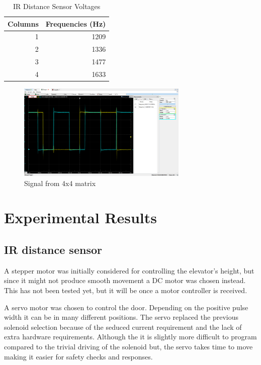 \documentclass{article}
\begin{document}
	            \begin{table}[!ht]
  	        \begin{center}
                \caption{IR Distance Sensor Voltages}
    		    \label{tab:table4}
    		    \begin{tabular}{r|r}
      			    \textbf{Columns} & \textbf{Frequencies (Hz)} \\
			        \hline
      			    1 & 1209\\
      			    2 & 1336\\
      			    3 & 1477\\
      			    4 & 1633\\
   			    \end{tabular}
  	        \end{center}
	    \end{table}
	    
	    \begin{figure}[!ht]
	        \begin{center}
		    \includegraphics[width=230pt]{buttontest.PNG}
		    \caption{Signal from 4x4 matrix}
	    	\label{fig:buttontest}
	    	\end{center}
	    \end{figure}
	    
    \section{Experimental Results}
        \subsection{IR distance sensor}
        A stepper motor was initially considered for controlling the elevator's height, but since it might not produce smooth movement a DC motor was chosen instead. This has not been tested yet, but it will be once a motor controller is received.
    
        A servo motor\cite{project_overview:servo_datasheet} was chosen to control the door. Depending on the positive pulse width it can be in many different positions. The servo replaced the previous solenoid selection because of the seduced current requirement and the lack of extra hardware requirements. Although the it is slightly more difficult to program compared to the trivial driving of the solenoid but, the servo takes time to move making it easier for safety checks and responses.
    
\end{document}
